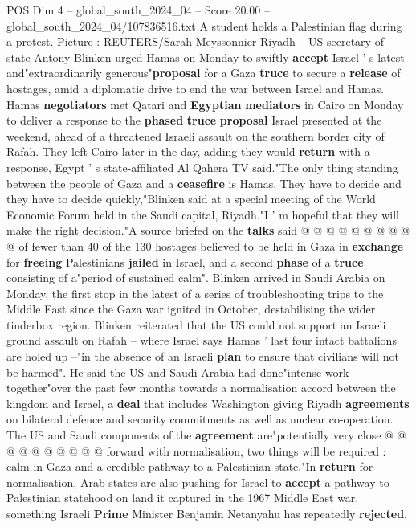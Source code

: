 \begin{textsample}{POS Dim 4 – global\_south\_2024\_04 – Score 20.00 – global\_south\_2024\_04/107836516.txt}  \label{ex:f4_pos_265}
A student holds a Palestinian flag during a protest.
Picture : REUTERS/Sarah Meyssonnier Riyadh -- US secretary of state Antony Blinken urged Hamas on Monday to swiftly \textbf{accept} Israel ' s latest and"extraordinarily generous"\textbf{proposal} for a Gaza \textbf{truce} to secure a \textbf{release} of hostages, amid a diplomatic drive to end the war between Israel and Hamas.
Hamas \textbf{negotiators} met Qatari and \textbf{Egyptian} \textbf{mediators} in Cairo on Monday to deliver a response to the \textbf{phased} \textbf{truce} \textbf{proposal} Israel presented at the weekend, ahead of a threatened Israeli assault on the southern border city of Rafah.
They left Cairo later in the day, adding they would \textbf{return} with a response, Egypt ' s state-affiliated Al Qahera TV said."The only thing standing between the people of Gaza and a \textbf{ceasefire} is Hamas.
They have to decide and they have to decide quickly,"Blinken said at a special meeting of the World Economic Forum held in the Saudi capital, Riyadh."I ' m hopeful that they will make the right decision."A source briefed on the \textbf{talks} said @ @ @ @ @ @ @ @ @ @ of fewer than 40 of the 130 hostages believed to be held in Gaza in \textbf{exchange} for \textbf{freeing} Palestinians \textbf{jailed} in Israel, and a second \textbf{phase} of a \textbf{truce} consisting of a"period of sustained calm".
Blinken arrived in Saudi Arabia on Monday, the first stop in the latest of a series of troubleshooting trips to the Middle East since the Gaza war ignited in October, destabilising the wider tinderbox region.
Blinken reiterated that the US could not support an Israeli ground assault on Rafah -- where Israel says Hamas ' last four intact battalions are holed up --"in the absence of an Israeli \textbf{plan} to ensure that civilians will not be harmed".
He said the US and Saudi Arabia had done"intense work together"over the past few months towards a normalisation accord between the kingdom and Israel, a \textbf{deal} that includes Washington giving Riyadh \textbf{agreements} on bilateral defence and security commitments as well as nuclear co-operation.
The US and Saudi components of the \textbf{agreement} are"potentially very close @ @ @ @ @ @ @ @ @ @ forward with normalisation, two things will be required : calm in Gaza and a credible pathway to a Palestinian state."In \textbf{return} for normalisation, Arab states are also pushing for Israel to \textbf{accept} a pathway to Palestinian statehood on land it captured in the 1967 Middle East war, something Israeli \textbf{Prime} Minister Benjamin Netanyahu has repeatedly \textbf{rejected}.

\end{textsample}
